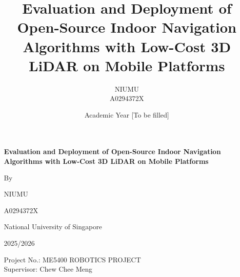 \documentclass[12pt,a4paper]{report}
\title{Evaluation and Deployment of Open-Source Indoor Navigation Algorithms with Low-Cost 3D LiDAR on Mobile Platforms}
\author{NIUMU\\A0294372X}
\date{Academic Year [To be filled]}
\begin{document}
\begin{titlepage}
    \centering
    {\LARGE\bfseries Evaluation and Deployment of Open-Source Indoor Navigation Algorithms with Low-Cost 3D LiDAR on Mobile Platforms\par}
    \vspace{1.5cm}
    {\large By\par}
    \vspace{0.3cm}
    {\Large NIUMU\par}
    \vspace{0.2cm}
    {\large A0294372X\par}
    \vspace{1.2cm}
    {\large National University of Singapore\par}
    \vspace{0.8cm}
    {\large 2025/2026\par}
    \vfill
    \begin{flushleft}
    Project No.: ME5400 ROBOTICS PROJECT\\
    Supervisor: Chew Chee Meng
    \end{flushleft}
\end{titlepage}

\end{document}
